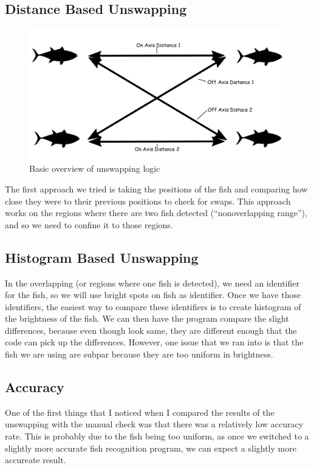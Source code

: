 \documentclass{article}
\begin{document}
\subsection{Distance Based Unswapping}
\begin{figure}[H]
	\centering
	\includegraphics[width=.75\linewidth]{fish2}
	\caption{Basic overview of unswapping logic}
\end{figure}
The first approach we tried is taking the positions of the fish and comparing how close they were to their previous positions to check for swaps. This approach works on the regions where there are two fish detected (``nonoverlapping range''), and so we need to confine it to those regions. 

\subsection{Histogram Based Unswapping}
In the overlapping (or regions where one fish is detected), we need an identifier for the fish, so we will use bright spots on fish as identifier. Once we have those identifiers, the easiest way to compare these identifiers is to create histogram of the brightness of the fish. We can then have the program compare the slight differences, because even though look same, they are different enough that the code can pick up the differences. However, one issue that we ran into is that the fish we are using are subpar because they are too uniform in brightness.

\subsection{Accuracy}

One of the first things that I noticed when I compared the results of the unswapping with the manual check was that there was a relatively low accuracy rate. This is probably due to the fish being too uniform, as once we switched to a slightly more accurate fish recognition program, we can expect a slightly more accureate result.
\end{document}
